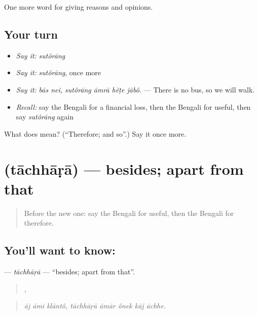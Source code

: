 \begin{grammarlens}[title={What you've built}]
One more word for giving reasons and opinions.
\end{grammarlens}

\subsection*{Your turn}
\begin{itemize}
\raggedright
  \item \emph{Say it:} \emph{sutôrāng}
  \item \emph{Say it:} \emph{sutôrāng}, once more
  \item \emph{Say it:} \emph{bās nei, sutôrāng āmrā hẽṭe jābô.} — There is no bus, so we will walk.
  \item \emph{Recall:} say the Bengali for a financial loss, then the Bengali for useful, then say \emph{sutôrāng} again
\end{itemize}

\begin{tcolorbox}[breakable,colback=teal!4,colframe=teal!35!black,title={Before you move on}]
What does  mean? (\textquotedblleft{}Therefore; and so\textquotedblright{}.) Say it once more.
\end{tcolorbox}
\section[\texorpdfstring{\bn{তাছাড়া} (tāchhāṛā)}{তাছাড়া (tāchhāṛā)}]{ (tāchhāṛā) — besides; apart from that}

\label{lesson:BN-C332-tachhara}



\begin{quote}
Before the new one: say the Bengali for useful, then the Bengali for therefore.
\end{quote}

\subsection*{You'll want to know: }
\textbf{} — \emph{tāchhāṛā} — \textquotedblleft{}besides; apart from that\textquotedblright{}.

\begin{quote}
  ,     
\end{quote}

\begin{quote}
\emph{āj āmi klāntô, tāchhāṛā āmār ônek kāj āchhe.}
\end{quote}

